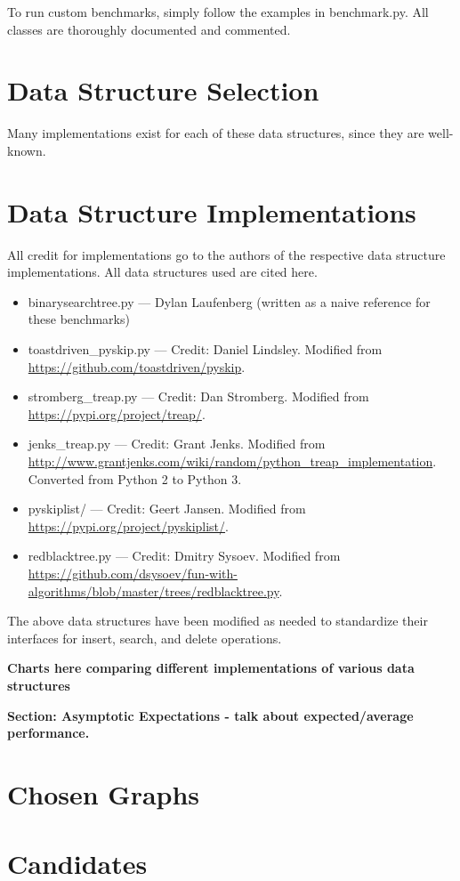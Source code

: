 \documentclass{article}
\newcommand {\todo}[1] {{\textbf{\color{red}#1}}}
\begin{document}
To run custom benchmarks, simply follow the examples in benchmark.py. All classes are thoroughly documented and commented.

\section{Data Structure Selection}
Many implementations exist for each of these data structures, since they are well-known. 

\section{Data Structure Implementations}
All credit for implementations go to the authors of the respective data structure implementations. All data structures used are cited here.

\begin{itemize}
    \item binarysearchtree.py --- Dylan Laufenberg (written as a naive reference for these benchmarks)
    \item toastdriven\_pyskip.py --- Credit: Daniel Lindsley. Modified from \url{https://github.com/toastdriven/pyskip}.
    \item stromberg\_treap.py --- Credit: Dan Stromberg. Modified from \url{https://pypi.org/project/treap/}.
    \item jenks\_treap.py --- Credit: Grant Jenks. Modified from \url{http://www.grantjenks.com/wiki/random/python_treap_implementation}. Converted from Python 2 to Python 3.
    \item pyskiplist/ --- Credit: Geert Jansen. Modified from \url{https://pypi.org/project/pyskiplist/}.
    \item redblacktree.py --- Credit: Dmitry Sysoev. Modified from \url{https://github.com/dsysoev/fun-with-algorithms/blob/master/trees/redblacktree.py}.
\end{itemize}

The above data structures have been modified as needed to standardize their interfaces for insert, search, and delete operations.

\todo{Charts here comparing different implementations of various data structures}

\todo{Section: Asymptotic Expectations - talk about expected/average performance.}
\newpage
\section{Chosen Graphs}


\section{Candidates}









% 
\end{document}
